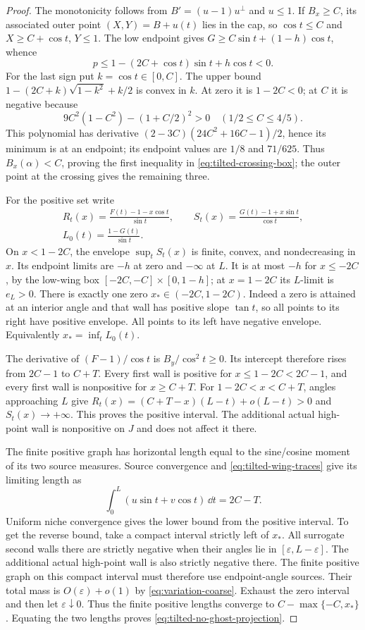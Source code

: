 \begin{proof}
The monotonicity follows from $B'=(u-1)u^\perp$ and $u\le1$.
If $B_x\ge C$, its associated outer point
$(X,Y)=B+u(t)$ lies in the cap, so $\cos t\le C$ and
$X\ge C+\cos t$, $Y\le1$. The low endpoint gives
$G\ge C\sin t+(1-h)\cos t$, whence
\[
 p\le1-(2C+\cos t)\sin t+h\cos t<0.
\]
For the last sign put $k=\cos t\in[0,C]$. The upper bound
$1-(2C+k)\sqrt{1-k^2}+k/2$ is convex in $k$.
At zero it is $1-2C<0$; at $C$ it is negative because
\[
 9C^2(1-C^2)-(1+C/2)^2>0\quad(1/2\le C\le4/5).
\]
This polynomial has derivative
$(2-3C)(24C^2+16C-1)/2$, hence its minimum is at an
endpoint; its endpoint values are $1/8$ and $71/625$.
Thus $B_x(\alpha)<C$, proving the first inequality in
\cref{eq:tilted-crossing-box}; the outer point at the crossing
gives the remaining three.

For the positive set write
\[
 \begin{gathered}
 R_t(x)=\frac{F(t)-1-x\cos t}{\sin t},\qquad
 S_t(x)=\frac{G(t)-1+x\sin t}{\cos t},\\
 L_0(t)=\frac{1-G(t)}{\sin t}.
 \end{gathered}
\]
On $x<1-2C$, the envelope $\sup_t S_t(x)$ is finite, convex,
and nondecreasing in $x$. Its endpoint limits are $-h$ at
zero and $-\infty$ at $L$. It is at most $-h$ for
$x\le-2C$, by the low-wing box $[-2C,-C]\times[0,1-h]$;
at $x=1-2C$ its $L$-limit is $e_L>0$.
There is exactly one zero $x_*\in(-2C,1-2C)$.
Indeed a zero is attained at an interior angle and that wall
has positive slope $\tan t$, so all points to its right have
positive envelope. All points to its left have negative envelope.
Equivalently $x_*=\inf_t L_0(t)$.

The derivative of $(F-1)/\cos t$ is $B_y/\cos^2t\ge0$.
Its intercept therefore rises from $2C-1$ to $C+T$.
Every first wall is positive for $x\le1-2C<2C-1$, and
every first wall is nonpositive for $x\ge C+T$.
For $1-2C<x<C+T$, angles approaching $L$ give
$R_t(x)=(C+T-x)(L-t)+o(L-t)>0$ and $S_t(x)\to+\infty$.
This proves the positive interval. The additional actual
high-point wall is nonpositive on $J$ and does not affect it there.

The finite positive graph has horizontal length equal to the
sine/cosine moment of its two source measures. Source convergence
and \cref{eq:tilted-wing-traces} give its limiting length as
\[
 \int_0^L(u\sin t+v\cos t)\,\dd t=2C-T.
\]
Uniform niche convergence gives the lower bound from the positive
interval. To get the reverse bound, take a compact interval
strictly left of $x_*$. All surrogate second walls there are strictly
negative when their angles lie in $[\varepsilon,L-\varepsilon]$.
The additional actual high-point wall is also strictly negative
there. The finite positive graph on this compact interval must
therefore use endpoint-angle sources. Their total mass is
$O(\varepsilon)+o(1)$ by \cref{eq:variation-coarse}.
Exhaust the zero interval and then let $\varepsilon\downarrow0$.
Thus the finite positive lengths converge to
$C-\max\{-C,x_*\}$. Equating the two lengths proves
\cref{eq:tilted-no-ghost-projection}.


\end{proof}
